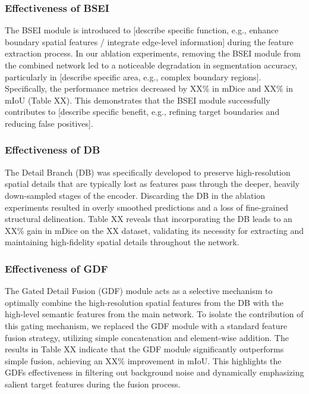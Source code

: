 \subsubsection{Effectiveness of BSEI}\label{effectiveness-of-bsei}

The BSEI module is introduced to {[}describe specific function, e.g.,
enhance boundary spatial features / integrate edge-level information{]}
during the feature extraction process. In our ablation experiments,
removing the BSEI module from the combined network led to a noticeable
degradation in segmentation accuracy, particularly in {[}describe
specific area, e.g., complex boundary regions{]}. Specifically, the
performance metrics decreased by XX\% in mDice and XX\% in mIoU (Table
XX). This demonstrates that the BSEI module successfully contributes to
{[}describe specific benefit, e.g., refining target boundaries and
reducing false positives{]}.

\subsubsection{Effectiveness of DB}\label{effectiveness-of-db}

The Detail Branch (DB) was specifically developed to preserve
high-resolution spatial details that are typically lost as features pass
through the deeper, heavily down-sampled stages of the encoder.
Discarding the DB in the ablation experiments resulted in overly
smoothed predictions and a loss of fine-grained structural delineation.
Table XX reveals that incorporating the DB leads to an XX\% gain in
mDice on the XX dataset, validating its necessity for extracting and
maintaining high-fidelity spatial details throughout the network.

\subsubsection{Effectiveness of GDF}\label{effectiveness-of-gdf}

The Gated Detail Fusion (GDF) module acts as a selective mechanism to
optimally combine the high-resolution spatial features from the DB with
the high-level semantic features from the main network. To isolate the
contribution of this gating mechanism, we replaced the GDF module with a
standard feature fusion strategy, utilizing simple concatenation and
element-wise addition. The results in Table XX indicate that the GDF
module significantly outperforms simple fusion, achieving an XX\%
improvement in mIoU. This highlights the GDF\textquotesingle s
effectiveness in filtering out background noise and dynamically
emphasizing salient target features during the fusion process.

